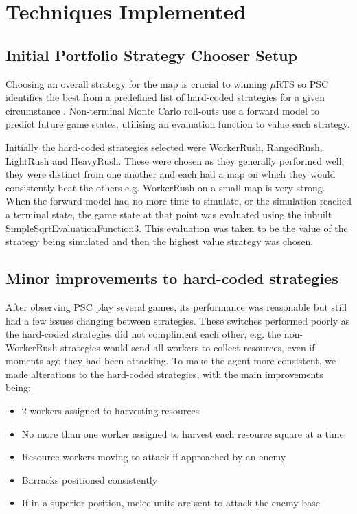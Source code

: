 \documentclass[]{article}
\begin{document}
\section{Techniques Implemented} \label{techImp}

\subsection{Initial Portfolio Strategy Chooser Setup}
Choosing an overall strategy for the map is crucial to winning $\mu$RTS so PSC identifies the best from a predefined list of hard-coded strategies for a given circumstance  \cite{ontanon2018first}. Non-terminal Monte Carlo roll-outs use a forward model to predict future game states, utilising an evaluation function to value each strategy.

Initially the hard-coded strategies selected were WorkerRush, RangedRush, LightRush and HeavyRush. These were chosen as they generally performed well, they were distinct from one another and each had a map on which they would consistently beat the others e.g. WorkerRush on a small map is very strong. When the forward model had no more time to simulate, or the simulation reached a terminal state, the game state at that point was evaluated using the inbuilt SimpleSqrtEvaluationFunction3. This evaluation was taken to be the value of the strategy being simulated and then the highest value strategy was chosen.

\subsection{Minor improvements to hard-coded strategies} \label{techImp:improvements}
After observing PSC play several games, its performance was  reasonable but still had a few issues changing between strategies. These switches performed poorly as the hard-coded strategies did not compliment each other, e.g. the non-WorkerRush strategies would send all workers to collect resources, even if moments ago they had been attacking. To make the agent more consistent, we made alterations to the hard-coded strategies, with the main improvements being: 

\begin{itemize}
\itemsep0em
\item 2 workers assigned to harvesting resources
\item No more than one worker assigned to harvest each resource square at a time
\item Resource workers moving to attack if approached by an enemy
\item Barracks positioned consistently 
\item If in a superior position, melee units are sent to attack the enemy base
\end{itemize}
\end{document}
